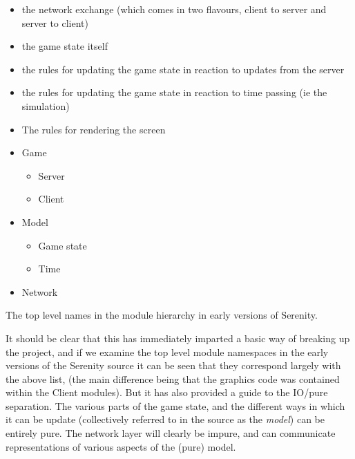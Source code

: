 \begin{itemize}\itemsep-3pt
    \item the network exchange (which comes in two flavours, client to server and server to client) 
    \item the game state itself
    \item the rules for updating the game state in reaction to updates from the server
    \item the rules for updating the game state in reaction to time passing (ie the simulation)
    \item The rules for rendering the screen
\end{itemize}

\begin{marginfigure}[6em]
	\begin{itemize}\parskip-3pt
    \item Game \begin{itemize}\itemsep-3pt
            \item Server
            \item Client
        \end{itemize}
    \item Model\begin{itemize}\itemsep-3pt
            \item Game state
            \item Time
        \end{itemize}
    \item Network
\end{itemize}
	\caption[The top level names in the module hierarchy in early versions of Serenity.]{The top level names in the module hierarchy in early versions of Serenity.}
	\label{fig:loops}
\end{marginfigure}

\noindent It should be clear that this has immediately imparted a basic way of breaking up the project, and if we examine the top level module namespaces in the early versions of the Serenity source it can be seen that they correspond largely with the above list, (the main difference being that the graphics code was contained within the Client modules). But it has also provided a guide to the IO/pure separation. The various parts of the game state, and the different ways in which it can be update (collectively referred to in the source as the \emph{model}) can be entirely pure. The network layer will clearly be impure, and can communicate representations of various aspects of the (pure) model.

